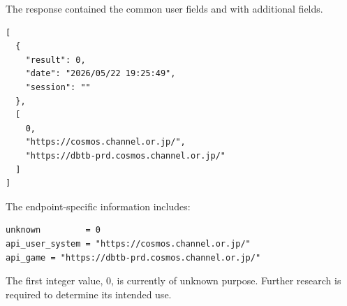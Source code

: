 The response contained the common user fields and with additional fields.

\begin{lstlisting}
[
  {
    "result": 0,
    "date": "2026/05/22 19:25:49",
    "session": ""
  },
  [
    0,
    "https://cosmos.channel.or.jp/",
    "https://dbtb-prd.cosmos.channel.or.jp/"
  ]
]
\end{lstlisting}

The endpoint-specific information includes:

\begin{lstlisting}
unknown         = 0
api_user_system = "https://cosmos.channel.or.jp/"
api_game = "https://dbtb-prd.cosmos.channel.or.jp/"
\end{lstlisting}

\begin{tcolorbox}[colback=yellow!10,colframe=orange!80!black,title=Warning]
The first integer value, $0$, is currently of unknown purpose.
Further research is required to determine its intended use.
\end{tcolorbox}

\newpage